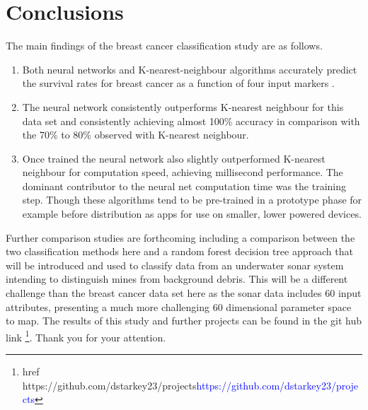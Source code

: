 \documentclass[10pt]{article}
\begin{document}
\section{Conclusions}
The main findings of the breast cancer classification study are as follows.

\begin{enumerate}
\item Both neural networks and K-nearest-neighbour algorithms accurately predict the survival rates for breast cancer as a function of four input markers .

\item The neural network consistently outperforms K-nearest neighbour for this data set and consistently achieving almost 100\% accuracy in comparison with the 70\% to 80\% observed with K-nearest neighbour.

\item Once trained the neural network also slightly outperformed K-nearest neighbour for computation speed, achieving millisecond performance. The dominant contributor to the neural net computation time was the training step. Though these algorithms tend to be pre-trained in a prototype phase for example before distribution as apps for use on smaller, lower powered devices. 
\end{enumerate}



Further comparison studies are forthcoming including a comparison between the two classification methods here and a random forest decision tree approach that will be introduced and used to classify data from an underwater sonar system intending to distinguish mines from background debris. This will be a different challenge than the breast cancer data set here as the sonar data includes 60 input attributes, presenting a much more challenging 60 dimensional parameter space to map. The results of this study and further projects can be found in the git hub link \footnote{href{ https://github.com/dstarkey23/projects}{\textcolor{blue}{https://github.com/dstarkey23/projects}}}. Thank you for your attention.
\end{document}

